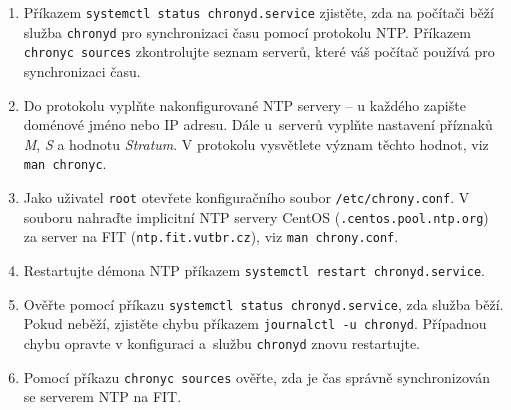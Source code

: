 \documentclass[a4paper,11pt]{article}
\begin{document}
\begin{enumerate}
  \item Příkazem {\tt systemctl status chronyd.service} zjistěte, zda na počítači běží služba \texttt{chronyd} pro synchronizaci času pomocí protokolu NTP. Příkazem {\tt chronyc sources} zkontrolujte seznam serverů, které váš počítač používá
    pro synchronizaci času.

  \item Do protokolu vyplňte nakonfigurované NTP servery -- u každého zapište doménové jméno nebo IP adresu. 
  Dále u~serverů vyplňte nastavení příznaků {\em M}, {\em S} a hodnotu {\em Stratum}.
  V protokolu vysvětlete význam těchto hodnot, viz \texttt{man chronyc}.

  \item Jako uživatel \texttt{root} otevřete konfiguračního soubor {\tt /etc/chrony.conf}. V souboru
    nahraďte implicitní NTP servery CentOS ({\tt *.centos.pool.ntp.org}) za server na FIT ({\tt ntp.fit.vutbr.cz}), viz {\tt man chrony.conf}.  
  \item Restartujte démona NTP příkazem {\tt systemctl restart chronyd.service}.
  \item Ověřte pomocí příkazu {\tt systemctl status chronyd.service}, zda služba běží. Pokud neběží, zjistěte chybu příkazem {\tt journalctl -u chronyd}. Případnou chybu opravte v konfiguraci a~službu {\tt chronyd} znovu restartujte.
  \item Pomocí příkazu {\tt chronyc sources} ověřte, zda je čas správně synchronizován se serverem NTP na FIT.

\end{enumerate}
\end{document}
